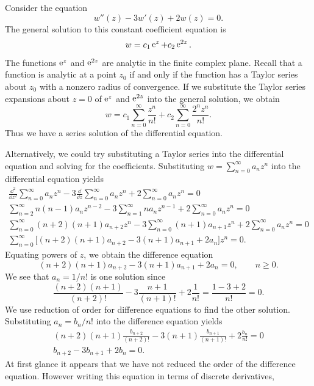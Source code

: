 \begin{Example} \label{ex_e2x}
  Consider the equation
  \[ 
  w''(z) -3w'(z) + 2w(z) = 0.
  \]
  The general solution to this constant coefficient equation is
  \[
  w = c_1 \mathop{\mathrm{e}}\nolimits^z + c_2 \mathop{\mathrm{e}}\nolimits^{2z}.
  \]
  The functions $\mathop{\mathrm{e}}\nolimits^z$ and $\mathop{\mathrm{e}}\nolimits^{2z}$ are analytic in the finite complex plane.
  Recall that a function is analytic at a point $z_0$ if and only if the
  function has a Taylor series about $z_0$ with a nonzero radius of convergence.
  If we substitute the Taylor series expansions about $z=0$ of $\mathop{\mathrm{e}}\nolimits^z$ and
  $\mathop{\mathrm{e}}\nolimits^{2z}$ into the general solution, we obtain
  \[ 
  w = c_1 \sum_{n=0}^\infty \frac{z^n}{n!} + c_2 \sum_{n=0}^\infty \frac{2^n z^n}{n!}. 
  \]
  Thus we have a series solution of the differential equation.

  Alternatively, we could try substituting a Taylor series into the differential
  equation and solving for the coefficients.
  Substituting $w = \sum_{n=0}^\infty a_n z^n$
  into the differential equation yields
  \begin{gather*}
    \frac{\dd^2}{\dd z^2} \sum_{n=0}^\infty a_n z^n - 3 \frac{\dd}{\dd z} \sum_{n=0}^\infty a_n z^
    n
    + 2 \sum_{n=0}^\infty a_n z^n = 0 \\
    \sum_{n=2}^\infty n(n-1) a_n z^{n-2} - 3 \sum_{n=1}^\infty n a_n z^{n-1}
    + 2 \sum_{n=0}^\infty a_n z^n = 0 \\
    \sum_{n=0}^\infty (n+2)(n+1) a_{n+2} z^n - 3 \sum_{n=0}^\infty (n+1)a_{n+1}z^n
    + 2 \sum_{n=0}^\infty a_n z^n = 0 \\
    \sum_{n=0}^\infty \Big[(n+2)(n+1)a_{n+2} - 3(n+1)a_{n+1} + 2 a_n \Big]z^n = 0.
  \end{gather*}
  Equating powers of $z$, we obtain the difference equation
  \[
  (n+2)(n+1)a_{n+2} - 3(n+1)a_{n+1} + 2 a_n = 0, \qquad n \geq 0.
  \]
  We see that $a_n = 1/n!$ is one solution since
  \[ 
  \frac{(n+2)(n+1)}{(n+2)!} - 3 \frac{n+1}{(n+1)!} + 2 \frac{1}{n!}
  = \frac{1-3+2}{n!} = 0. 
  \]
  We use reduction of order for difference equations to find the other solution.
  Substituting $a_n = b_n / n!$ into the difference equation yields
  \begin{gather*}
    (n+2)(n+1)\frac{b_{n+2}}{(n+2)!} - 3 (n+1) \frac{b_{n+1}}{(n+1)!}
    + 2 \frac{b_n}{n!} = 0 \\
    b_{n+2} - 3 b_{n+1} + 2 b_n = 0.
  \end{gather*}
  At first glance it appears that we have not reduced the order of the
  difference equation.  However writing this equation in terms of discrete
  derivatives,

\end{Example}
